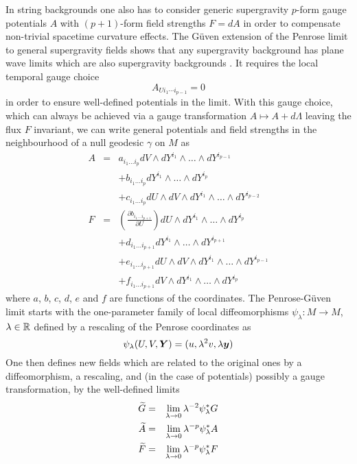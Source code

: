 In string backgrounds one also has to consider generic supergravity $p$-form
gauge potentials $A$ with $(p+1)$-form field strengths $F=dA$ in order to
compensate non-trivial spacetime curvature effects. The G\"uven extension of the
Penrose limit to general supergravity fields shows that any supergravity
background has plane wave limits which are also supergravity backgrounds
\cite{Guven1}. It requires the local temporal gauge choice
\begin{equation}
  \label{PGgaugechoice}
  A_{Ui_1\cdots i_{p-1}}=0
\end{equation}
in order to ensure well-defined potentials in the limit. With this
gauge choice, which can always be achieved via a gauge transformation
$A\mapsto A+d\Lambda$ leaving the flux $F$ invariant, we can write
general potentials and field strengths in the neighbourhood of a null
geodesic $\gamma$ on $M$ as
\begin{eqnarray}
  \label{Anull}
  A &=& a_{i_1 \ldots i_p} dV\wedge dY^{i_1}\wedge\ldots\wedge
  dY^{i_{p-1}} \\ \nonumber
  &&+b_{i_1\ldots i_p} dY^{i_1}\wedge\ldots\wedge dY^{i_p}\\ \nonumber
  &&+c_{i_1\ldots i_p} dU\wedge dV\wedge dY^{i_1}\wedge\ldots\wedge
  dY^{i_{p-2}} \\
  \label{Fnull}
  F &=& \left( \frac{\partial b_{i_1 \ldots i_{p+1}}}{\partial U}
  \right) dU\wedge dY^{i_1}\wedge\ldots\wedge dY^{i_{p}} \\ \nonumber
  &&+ d_{i_1 \ldots i_{p+1}} dY^{i_1}\wedge\ldots\wedge dY^{i_{p+1}} \\ \nonumber
  &&+ e_{i_1 \ldots i_{p+1}} dU\wedge dV\wedge dY^{i_1}\wedge\ldots\wedge
  dY^{i_{p-1}} \\ \nonumber
  &&+ f_{i_1 \ldots i_{p+1}} dV\wedge dY^{i_1}\wedge\ldots\wedge dY^{i_{p}}  
\end{eqnarray}
where $a$, $b$, $c$, $d$, $e$ and $f$ are functions of the coordinates. The
Penrose-G\"uven limit starts with the one-parameter family of local
diffeomorphisms $\psi_\lambda:M\to M$, $\lambda\in{\mathbb R}$ defined by a rescaling
of the Penrose coordinates as
\begin{equation}
  \label{psiOmegadef}
  \psi_\lambda(U,V,{\boldsymbol {Y} })=(u,\lambda^2v,\lambda{\boldsymbol {y} })
\end{equation}
One then defines new fields which are related to the original ones by a
diffeomorphism, a rescaling, and (in the case of potentials) possibly a gauge
transformation, by the well-defined limits
\begin{eqnarray}
  \label{PGlimitsdef}
  \widetilde{G}&=&\lim_{\lambda\to0}\lambda^{-2}\psi^*_\lambda G \\\nonumber
  \widetilde{A}&=&\lim_{\lambda\to0}\lambda^{-p}\psi^*_\lambda A \\\nonumber
  \widetilde{F}&=&\lim_{\lambda\to0}\lambda^{-p}\psi^*_\lambda F
\end{eqnarray}

